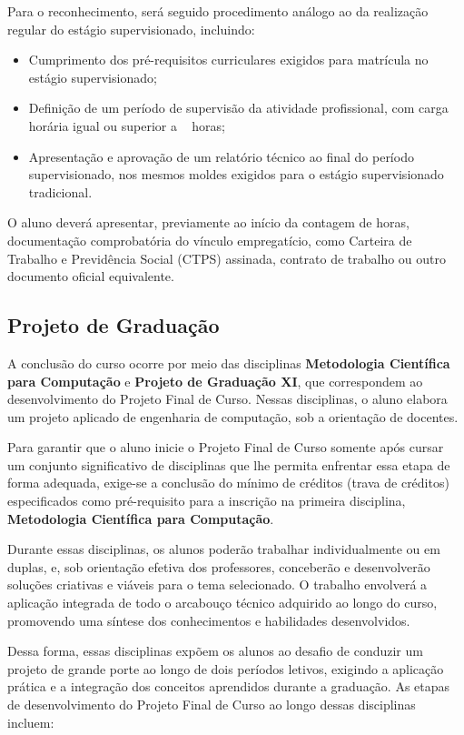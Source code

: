 Para o reconhecimento, será seguido procedimento análogo ao da realização regular do estágio supervisionado, incluindo:

\begin{itemize}
    \item Cumprimento dos pré-requisitos curriculares exigidos para matrícula no estágio supervisionado;
    \item Definição de um período de supervisão da atividade profissional, com carga horária igual ou superior a \EstSupCH~ horas;
    \item Apresentação e aprovação de um relatório técnico ao final do período supervisionado, nos mesmos moldes exigidos para o estágio supervisionado tradicional. \end{itemize}

O aluno deverá apresentar, previamente ao início da contagem de horas, documentação comprobatória do vínculo empregatício, como Carteira de Trabalho e Previdência Social (CTPS) assinada, contrato de trabalho ou outro documento oficial equivalente.



\subsection{Projeto de Graduação}

A conclusão do curso ocorre por meio das disciplinas \textbf{Metodologia Científica para Computação} e \textbf{Projeto de Graduação XI}, que correspondem ao desenvolvimento do Projeto Final de Curso. Nessas disciplinas, o aluno elabora um projeto aplicado de engenharia de computação, sob a orientação de docentes.

Para garantir que o aluno inicie o Projeto Final de Curso somente após cursar um conjunto significativo de disciplinas que lhe permita enfrentar essa etapa de forma adequada, exige-se a conclusão do mínimo de créditos (trava de créditos) especificados como pré-requisito para a inscrição na primeira disciplina, \textbf{Metodologia Científica para Computação}.

Durante essas disciplinas, os alunos poderão trabalhar individualmente ou em duplas, e, sob orientação efetiva dos professores, conceberão e desenvolverão soluções criativas e viáveis para o tema selecionado. O trabalho envolverá a aplicação integrada de todo o arcabouço técnico adquirido ao longo do curso, promovendo uma síntese dos conhecimentos e habilidades desenvolvidos.

Dessa forma, essas disciplinas expõem os alunos ao desafio de conduzir um projeto de grande porte ao longo de dois períodos letivos, exigindo a aplicação prática e a integração dos conceitos aprendidos durante a graduação. As etapas de desenvolvimento do Projeto Final de Curso ao longo dessas disciplinas incluem:

